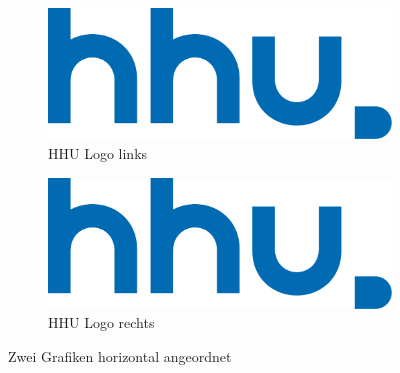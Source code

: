\begin{figure}
  \centering
  \begin{subfigure}[b]{0.45\textwidth}
    \includegraphics[width=1.0\linewidth]{img/hhu}
    \caption{HHU Logo links}
    \label{grafik_3}
  \end{subfigure}
  \begin{subfigure}[b]{0.45\textwidth}
    \includegraphics[width=1.0\linewidth]{img/hhu}
    \caption{HHU Logo rechts}
    \label{grafik_4}
  \end{subfigure}
  \caption{Zwei Grafiken horizontal angeordnet}
  \label{zwei_grafiken}
\end{figure}

